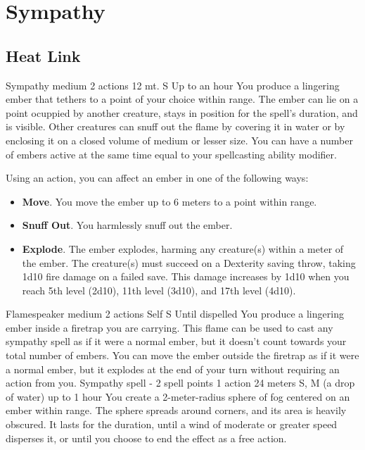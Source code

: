 \section{Sympathy}
\subsection*{Heat Link}
        {Sympathy medium}
        {2 actions}
        {12 mt.}
        {S}
        {Up to an hour}
        You produce a lingering ember that tethers to a point of your choice within range.
        The ember can lie on a point ocuppied by another creature, stays in position for the spell's duration, and is visible.
        Other creatures can snuff out the flame by covering it in water or by enclosing it on a closed volume of medium or lesser size.
        You can have a number of embers active at the same time equal to your spellcasting ability modifier.

        Using an action, you can affect an ember in one of the following ways:
        \begin{itemize}
            \item \textbf{Move}.
            You move the ember up to 6 meters to a point within range.
            \item \textbf{Snuff Out}.
            You harmlessly snuff out the ember.
            \item \textbf{Explode}.
            The ember explodes, harming any creature(s) within a meter of the ember.
            The creature(s) must succeed on a Dexterity saving throw, taking 1d10 fire damage on a failed save.
            This damage increases by 1d10 when you reach 5th level (2d10), 11th level (3d10), and 17th level (4d10).
        \end{itemize}
        {Flamespeaker medium}
        {2 actions}
        {Self}
        {S}
        {Until dispelled}
        You produce a lingering ember inside a firetrap you are carrying.
        This flame can be used to cast any sympathy spell as if it were a normal ember, but it doesn't count towards your total number of embers.
        You can move the ember outside the firetrap as if it were a normal ember, but it explodes at the end of your turn without requiring an action from you.
        {Sympathy spell - 2 spell points}
        {1 action}
        {24 meters}
        {S, M (a drop of water)}
        {up to 1 hour}
        You create a 2-meter-radius sphere of fog centered on an ember within range.
        The sphere spreads around corners, and its area is heavily obscured.
        It lasts for the duration, until a wind of moderate or greater speed disperses it, or until you choose to end the effect as a free action.

